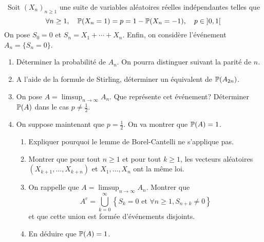\begin{td-exo}[]\, %
    Soit \({(X_n)}_{n\geq 1}\) une suite de variables aléatoires réelles
    indépendantes telles que
    \begin{equation*}
        \forall n\geq 1,\quad \mathbb{P}(X_n=1)=p=1-\mathbb{P}(X_n=-1),\quad p\in\mathopen{}\left]0,1\right[\mathclose{}
    \end{equation*}
    On pose \(S_0=0\) et \(S_n = X_1+\cdots+X_n\). Enfin, on considère l'événement
    \(A_n = \{S_n = 0\}\).
    \begin{enumerate}
        \item Déterminer la probabilité de \(A_n\). On pourra distinguer
        suivant la parité de \(n\).

        \item A l'aide de la formule de Stirling, déterminer un équivalent
        de \(\mathbb{P}(A_{2n})\).

        \item On pose \(A=\limsup_{n\to\infty} A_n\). Que représente cet
        événement? Déterminer \(\mathbb{P}(A)\) dans le cas \(p\neq\frac12\).

        \item On suppose maintenant que \(p=\frac12\). On va montrer que
        \(\mathbb{P}(A)=1\).
        \begin{enumerate}
            \item Expliquer pourquoi le lemme de Borel-Cantelli ne
            s'applique pas.

            \item Montrer que pour tout \(n\geq 1\) et pour tout \(k\geq 1\),
            les vecteurs aléatoires \((X_{k+1},\ldots,X_{k+n})\) et
            \(X_1,\ldots,X_n\) ont la même loi.

            \item On rappelle que \(A=\limsup_{n\to\infty}A_n\). Montrer que
            \begin{equation*}
                A^c = \bigcup_{k=0}^\infty\left\{ S_k=0\text{ et }\forall n\geq 1,S_{n+k}\neq 0\right\}
            \end{equation*}
            et que cette union est formée d'événements disjoints.

            \item En déduire que \(\mathbb{P}(A)=1\).
        \end{enumerate}
    \end{enumerate}
\end{td-exo}


